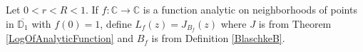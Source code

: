 \begin{definition}[JBlaschke]
\label{JBlaschke}
\leanok
Let $0 < r < R<1$. If $f:\mathbb{C}\to\mathbb{C}$ is a function analytic on
    neighborhoods of points in $\overline{\mathbb{D}_1}$ with $f(0)=1$, define
    $L_f(z)=J_{B_f}(z)$ where $J$ is from Theorem \ref{LogOfAnalyticFunction} and $B_f$
    is from Definition \ref{BlaschkeB}.
\end{definition}
